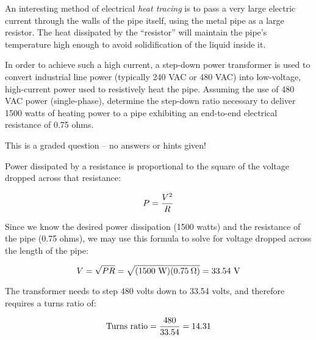 

An interesting method of electrical {\it heat tracing} is to pass a very large electric current through the walls of the pipe itself, using the metal pipe as a large resistor.  The heat dissipated by the ``resistor'' will maintain the pipe's temperature high enough to avoid solidification of the liquid inside it.

\vskip 10pt

In order to achieve such a high current, a step-down power transformer is used to convert industrial line power (typically 240 VAC or 480 VAC) into low-voltage, high-current power used to resistively heat the pipe.  Assuming the use of 480 VAC power (single-phase), determine the step-down ratio necessary to deliver 1500 watts of heating power to a pipe exhibiting an end-to-end electrical resistance of 0.75 ohms.

\vfil 

\eject






This is a graded question -- no answers or hints given!







Power dissipated by a resistance is proportional to the square of the voltage dropped across that resistance:

$$P = {V^2 \over R}$$

Since we know the desired power dissipation (1500 watts) and the resistance of the pipe (0.75 ohms), we may use this formula to solve for voltage dropped across the length of the pipe:

$$V = \sqrt{P R} = \sqrt{(1500 \hbox { W})(0.75 \> \Omega)} = 33.54 \hbox{ V}$$
 
The transformer needs to step 480 volts down to 33.54 volts, and therefore requires a turns ratio of:

$$\hbox{Turns ratio} = {480 \over 33.54} = 14.31$$



